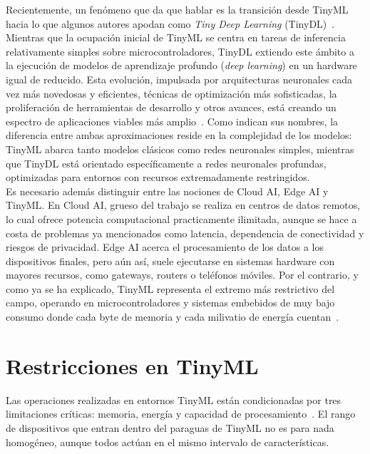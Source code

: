 \documentclass[a4paper,12pt,twoside,final]{book}
\begin{document}
Recientemente, un fenómeno que da que hablar es la transición desde TinyML hacia lo que algunos autores apodan como
\textit{Tiny Deep Learning} (TinyDL)~\cite{somvanshi2025acm,rouhani2017ieeeiscas}. Mientras que la ocupación
inicial de TinyML se centra en tareas de inferencia relativamente simples sobre microcontroladores, TinyDL extiendo
este ámbito a la ejecución de modelos de aprendizaje profundo (\textit{deep learning}) en un hardware igual de
reducido. Esta evolución, impulsada por arquitecturas neuronales cada vez más novedosas y eficientes, técnicas de
optimización más sofisticadas, la proliferación de herramientas de desarrollo y otros avances, está creando un
espectro de aplicaciones viables más amplio~\cite{somvanshi2025acm}. Como indican sus nombres, la diferencia entre
ambas aproximaciones reside en la complejidad de los modelos: TinyML abarca tanto modelos clásicos como redes
neuronales simples, mientras que TinyDL está orientado específicamente a redes neuronales profundas, optimizadas
para entornos con recursos extremadamente restringidos.\\

Es necesario además distinguir entre las nociones de Cloud AI, Edge AI y TinyML. En Cloud AI, grueso del trabajo
se realiza en centros de datos remotos, lo cual ofrece potencia computacional practicamente ilimitada, aunque se
hace a costa de problemas ya mencionados como latencia, dependencia de conectividad y riesgos de privacidad. Edge AI
acerca el procesamiento de los datos a los dispositivos finales, pero aún así, suele ejecutarse en sistemas hardware
con mayores recursos, como gateways, routers o teléfonos móviles. Por el contrario, y como ya se ha explicado, TinyML
representa el extremo más restrictivo del campo, operando en microcontroladores y sistemas embebidos de muy bajo
consumo donde cada byte de memoria y cada milivatio de energía cuentan~\cite{ray2022kingsaud}.

\section{Restricciones en TinyML}
Las operaciones realizadas en entornos TinyML están condicionadas por tres limitaciones críticas: memoria,
energía y capacidad de procesamiento~\cite{somvanshi2025acm}. El rango de dispositivos que entran dentro del
paraguas de TinyML no es para nada homogéneo, aunque todos actúan en el mismo intervalo de características.\\
\end{document}
